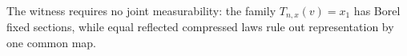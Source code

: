 The witness requires no joint measurability: the family \(T_{n,x}(v)=x_1\) has Borel fixed sections, while equal reflected compressed laws rule out representation by one common map.